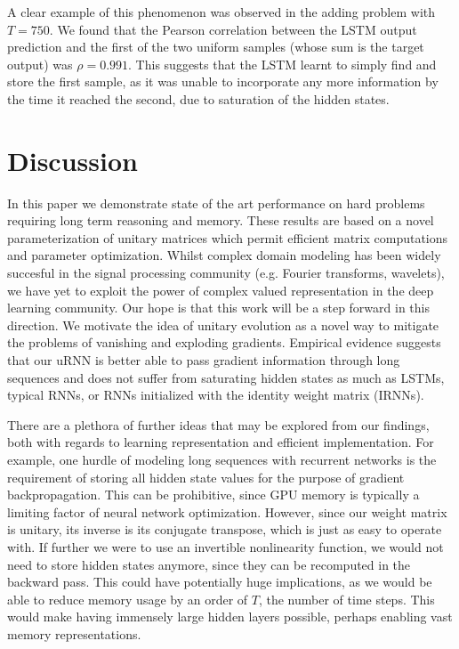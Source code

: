 \documentclass{article} %
\begin{document}
A clear example of this phenomenon was observed in the adding problem with $T=750$. We found that the 
Pearson correlation between the LSTM output prediction and the first of the two uniform samples (whose 
sum is the target output) was $\rho = 0.991$. This suggests that the LSTM learnt to simply find and store the 
first sample, as it was unable to 
incorporate any more information by the time it reached the second, due to 
saturation of the hidden states.    


\section{Discussion}

In this paper we demonstrate state of the art performance on hard problems requiring
long term reasoning and memory. These results are based on a novel parameterization of unitary matrices which permit
efficient matrix computations and parameter optimization. Whilst complex domain modeling has been 
widely succesful in the signal processing community (e.g. Fourier transforms, wavelets), we have yet to 
exploit the power of complex valued representation in the deep learning community. Our hope is that this
work will be a step forward in this direction. We motivate the idea of unitary evolution as a novel way
to mitigate the problems of vanishing and exploding gradients. Empirical evidence suggests that our uRNN is better able
to pass gradient information through long sequences and does not suffer from saturating hidden states as much
as LSTMs, typical RNNs, or RNNs initialized with the identity weight matrix (IRNNs).

There are a plethora of further ideas that may be explored from our findings, both with regards to 
learning representation and efficient implementation. For example, one hurdle of modeling long sequences 
with recurrent networks is the requirement of storing all hidden state values for the purpose of gradient
backpropagation. This can be prohibitive, since GPU memory is typically a limiting factor of neural network 
optimization. However, since our weight matrix is unitary, its inverse is its conjugate transpose, 
which is just as easy to operate with. If further we were to use an invertible nonlinearity function, we would 
not need to store hidden states anymore, since they can be recomputed in the backward pass. This could have 
potentially huge implications, as we would be able to reduce memory usage by an order of $T$, the number of
time steps. This would make having immensely large hidden layers possible, perhaps enabling vast memory representations.
  
\end{document}

